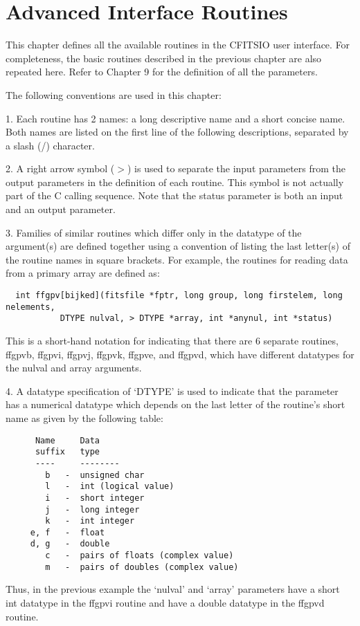 \chapter{   Advanced Interface Routines }

This chapter defines all the available routines in the CFITSIO user
interface.  For completeness, the basic routines
described in the previous chapter are also repeated here.
Refer to Chapter 9 for the definition of all the parameters.

The following conventions are used in this chapter:

1. Each routine has 2 names: a long descriptive
name and a short concise name.  Both names are listed on the first
line of the following descriptions, separated by a slash (/) character.

2. A right arrow symbol ($>$) is used to separate the input parameters from
the output parameters in the  definition of each routine.  This symbol
is not actually part of the C calling sequence.  Note that
the status parameter is both an input and an output parameter.

3. Families of similar routines which differ only in the datatype
of the argument(s) are defined together using a convention
of listing the last letter(s) of the routine names in square brackets.
For example, the routines for reading data from a primary array
are defined as:

\begin{verbatim}
  int ffgpv[bijked](fitsfile *fptr, long group, long firstelem, long nelements,
           DTYPE nulval, > DTYPE *array, int *anynul, int *status)
\end{verbatim}
This is a short-hand notation for indicating that there are 6
separate routines, ffgpvb, ffgpvi, ffgpvj, ffgpvk, ffgpve, and ffgpvd,
which have different datatypes for the nulval and array arguments.

4. A datatype specification of `DTYPE' is used to indicate
that the parameter has a numerical datatype which depends on the last
letter of the routine's short name as given by the following table:

\begin{verbatim}
      Name     Data
      suffix   type
      ----     --------
        b   -  unsigned char
        l   -  int (logical value)
        i   -  short integer
        j   -  long integer
        k   -  int integer
     e, f   -  float
     d, g   -  double
        c   -  pairs of floats (complex value)
        m   -  pairs of doubles (complex value)
\end{verbatim}
Thus, in the previous example the `nulval' and `array'  parameters have
a short int datatype in the ffgpvi routine and have a
double datatype in the ffgpvd routine.


